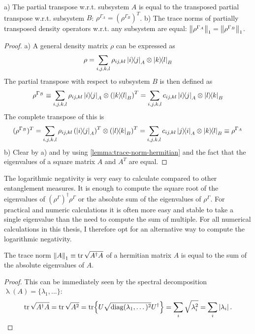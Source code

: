 \begin{proposition}
  a) The partial transpose w.r.t. subsystem $A$ is equal to the transposed partial transpose w.r.t. subsystem $B$: $\rho^{\Gamma_A} = (\rho^{\Gamma_B})^T$. 
  b) The trace norms of partially transposed density operators w.r.t. any subsystem are equal: $\left\lVert\rho^{\Gamma_A}\right\rVert_1 = \left\lVert\rho^{\Gamma_B}\right\rVert_1$.
\end{proposition}
\begin{proof}
  a) A general density matrix $\rho$ can be expressed as
  \begin{equation*}
    \rho = \sum_{i,j,k,l} \rho_{ij,kl} \ketbra{i}{j}_A\otimes\ketbra{k}{l}_B
  \end{equation*}
  The partial transpose with respect to subsystem $B$ is then defined as 
  \begin{equation*}
    \rho^{\Gamma_B} \equiv \sum_{i,j,k,l} \rho_{ij,kl} \ketbra{i}{j}_A\otimes\left(\ketbra{k}{l}_B\right)^T = \sum_{i,j,k,l} c_{ij,kl} \ketbra{i}{j}_A\otimes\ketbra{l}{k}_B
  \end{equation*}
  The complete transpose of this is
  \begin{equation*}
    (\rho^{\Gamma_B})^T = \sum_{i,j,k,l} \rho_{ij,kl} \left(\ketbra{i}{j}_A\right)^T\otimes\left(\ketbra{l}{k}_B\right)^T = \sum_{i,j,k,l} c_{ij,kl} \ketbra{j}{i}_A\otimes\ketbra{k}{l}_B \equiv \rho^{\Gamma_A}
  \end{equation*}
  b) Clear by a) and by using \cref{lemma:trace-norm-hermitian} and the fact that the eigenvalues of a square matrix $A$ and $A^T$ are equal.
\end{proof}

The logarithmic negativity is very easy to calculate compared to other entanglement measures. It is enough to compute the square root of the eigenvalues of $(\rho^{\Gamma})^\dagger \rho^{\Gamma}$ or the absolute sum of the eigenvalues of $\rho^{\Gamma}$.
For practical and numeric calculations it is often more easy and stable to take a single eigenvalue than the need to compute the sum of multiple. 
For all numerical calculations in this thesis, I therefore opt for an alternative way to compute the logarithmic negativity.

\begin{lemma}\label{lemma:trace-norm-hermitian}
  The trace norm $\left\lVert A\right\rVert_1 \equiv \tr \sqrt{A^\dagger A}$ of a hermitian matrix $A$ is equal to the sum of the absolute eigenvalues of $A$.
\end{lemma}
\begin{proof}
  This can be immediately seen by the spectral decomposition $\operatorname{\lambda}(A) = \{\lambda_1,...\}$:
  \begin{equation*}
    \tr \sqrt{A^\dagger A} = \tr \sqrt{A^2} = \tr{U\sqrt{\operatorname{diag}(\lambda_1, \dots)^2}U^\dagger} = \sum_i \sqrt{\lambda_i^2} = \sum_i \left\lvert\lambda_i\right\rvert.
  \end{equation*}
\end{proof}

